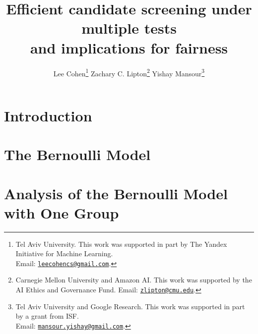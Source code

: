 \documentclass{article}
\title{Efficient candidate screening
under multiple tests\\ and implications for fairness}
\begin{document}
\author{
  Lee Cohen\thanks{Tel Aviv University. This work was supported in part by The Yandex Initiative for Machine Learning.\\ Email: \href{mailto:leecohencs@gmail.com}{\nolinkurl{leecohencs@gmail.com}}.}\hspace*{1cm}
  Zachary C. Lipton\thanks{Carnegie Mellon University and Amazon AI. This work was supported by the AI Ethics and Governance Fund. Email: \href{mailto:zlipton@cmu.edu}{\nolinkurl{zlipton@cmu.edu}}.}\hspace*{1cm}
  Yishay Mansour\thanks{Tel Aviv University and Google Research. This work was supported in part by a grant from ISF.\\ Email: \href{mailto:mansour.yishay@gmail.com}{\nolinkurl{mansour.yishay@gmail.com}}.}
}



\maketitle

\begin{abstract}

\end{abstract}

\section{Introduction}
\label{sec:intro}


\section{The Bernoulli Model}
\label{sec:bernoulliModel}


\section{Analysis of the Bernoulli Model with One Group}
\label{sec:oneGroup}

\end{document}
